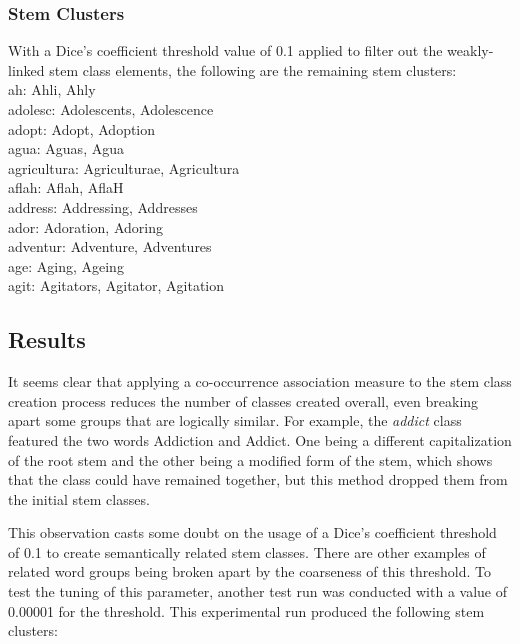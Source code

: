 \subsubsection{Stem Clusters}
With a Dice's coefficient threshold value of 0.1 applied to filter out the weakly-linked stem class elements, the following are the remaining stem clusters:\\

\noindent
ah: Ahli, Ahly\\
adolesc: Adolescents, Adolescence\\
adopt: Adopt, Adoption\\
agua: Aguas, Agua\\
agricultura: Agriculturae, Agricultura\\
aflah: Aflah, AflaH\\
address: Addressing, Addresses\\
ador: Adoration, Adoring\\
adventur: Adventure, Adventures\\
age: Aging, Ageing\\
agit: Agitators, Agitator, Agitation\\


\subsection{Results}
It seems clear that applying a co-occurrence association measure to the stem class creation process reduces the number of classes created overall, even breaking apart some groups that are logically similar.  For example, the \textit{addict} class featured the two words Addiction and Addict.  One being a different capitalization of the root stem and the other being a modified form of the stem, which shows that the class could have remained together, but this method dropped them from the initial stem classes.

This observation casts some doubt on the usage of a Dice's coefficient threshold of 0.1 to create semantically related stem classes.  There are other examples of related word groups being broken apart by the coarseness of this threshold.  To test the tuning of this parameter, another test run was conducted with a value of 0.00001 for the threshold.  This experimental run produced the following stem clusters:\\


